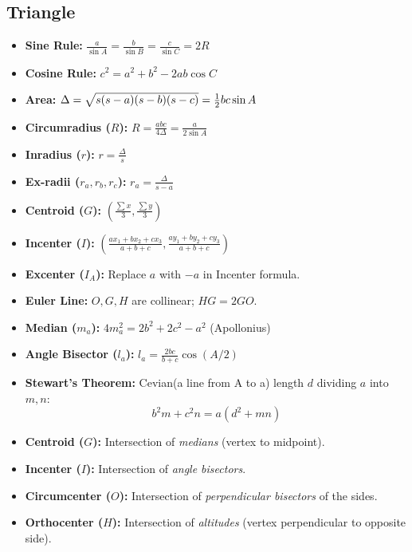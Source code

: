 \subsection{Triangle}
\begin{itemize}[leftmargin=*]
    \item \textbf{Sine Rule:} $\frac{a}{\sin A} = \frac{b}{\sin B} = \frac{c}{\sin C} = 2R $
    \item \textbf{Cosine Rule:} $c^2 = a^2 + b^2 - 2ab \cos C$
    \item \textbf{Area:} $\Delta = \sqrt{s(s-a)(s-b)(s-c)} \\ = \frac{1}{2}bc \sin A$
    \item \textbf{Circumradius ($R$):} $R = \frac{abc}{4\Delta} = \frac{a}{2\sin A}$
    \item \textbf{Inradius ($r$):} $r = \frac{\Delta}{s}$
    \item \textbf{Ex-radii ($r_a, r_b, r_c$):} $r_a = \frac{\Delta}{s-a}$
    \item \textbf{Centroid ($G$):} $\left( \frac{\sum x}{3}, \frac{\sum y}{3} \right)$
    \item \textbf{Incenter ($I$):} $\left( \frac{ax_1+bx_2+cx_3}{a+b+c}, \frac{ay_1+by_2+cy_3}{a+b+c} \right)$
    \item \textbf{Excenter ($I_A$):} Replace $a$ with $-a$ in Incenter formula.
    \item \textbf{Euler Line:} $O, G, H$ are collinear; $HG = 2GO$.
    \item \textbf{Median ($m_a$):} $4m_a^2 = 2b^2 + 2c^2 - a^2$ (Apollonius)
    \item \textbf{Angle Bisector ($l_a$):} $l_a = \frac{2bc}{b+c}\cos(A/2)$
    \item \textbf{Stewart's Theorem:} Cevian(a line from A to a) length $d$ dividing $a$ into $m, n$:
          \[ b^2m + c^2n = a(d^2 + mn) \]
    \item \textbf{Centroid ($G$):} Intersection of \textit{medians} (vertex to midpoint).
    \item \textbf{Incenter ($I$):} Intersection of \textit{angle bisectors}.
    \item \textbf{Circumcenter ($O$):} Intersection of \textit{perpendicular bisectors} of the sides.
    \item \textbf{Orthocenter ($H$):} Intersection of \textit{altitudes} (vertex perpendicular to opposite side).
\end{itemize}
